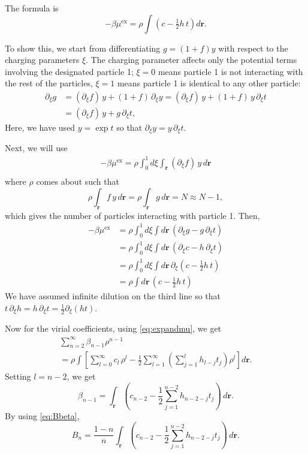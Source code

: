 \documentclass[aip,jcp,reprint,superscriptaddress]{revtex4-1}
\numberwithin{equation}{subsection}
\newcommand{\vct}[1]{\mathbf{#1}}
\providecommand{\vr}{} %
\renewcommand{\vr}{\vct{r}}
\newcommand{\supex}[1]{ { { #1 }^{ \mathrm{ex} } } }
\newcommand{\muex}{\supex{\mu}}
\begin{document}
The formula is
\begin{equation}
  -\beta \muex = \rho \int \left( c - \tfrac{1}{2} h \, t\right) d\vr.
  \label{eq:muex}
\end{equation}

To show this,
we start from differentiating $g = (1+f)y$ with respect to
the charging parameters $\xi$.
The charging parameter affects only the potential terms involving
the designated particle 1;
$\xi = 0$ means particle 1 is not interacting with the rest of the particles,
$\xi = 1$ means particle 1 is identical to any other particle:
\begin{align*}
  \partial_\xi g
  &= (\partial_\xi f) \, y + (1+f) \, \partial_\xi y
  = (\partial_\xi f) \, y + (1+f) \, y \, \partial_\xi t \\
  &= (\partial_\xi f) \, y + g \, \partial_\xi t,
\end{align*}
Here, we have used $y = \exp t$ so that $\partial_\xi y = y \, \partial_\xi t$.

Next, we will use
\begin{align*}
  -\beta \muex
  = \rho \int_0^1 d\xi \int_\vr (\partial_\xi f) \, y \, d\vr \\
\end{align*}
where $\rho$ comes about such that
\[
  \rho \int_\vr f \, y \, d \vr = \rho \int_\vr g \, d\vr = N
  \approx N - 1,
\]
which gives the number of particles interacting with particle 1.
%
Then,
\begin{align*}
  -\beta \muex
  &= \rho \int_0^1 d\xi \int d\vr \, (\partial_\xi g - g \, \partial_\xi t) \\
  &= \rho \int_0^1 d\xi \int d\vr \, (\partial_\xi c - h \, \partial_\xi t) \\
  &= \rho \int_0^1 d\xi \int d\vr \, \partial_\xi \left(c - \tfrac{1}{2} h \, t \right) \\
  &= \rho \int d\vr \, \left(c - \tfrac{1}{2} h \, t \right)
\end{align*}
We have assumed infinite dilution on the third line so that
$t \, \partial_\xi h = h \, \partial_\xi t = \tfrac{1}{2} \partial_\xi (h t)$.


Now for the virial coefficients,
using \eqref{eq:expandmu},
we get
\begin{multline*}
  \sum_{n = 2}^\infty \beta_{n - 1} \rho^{n - 1}
\\
= \rho \int
  \left[
  \sum_{l = 0}^\infty c_l \, \rho^l
  -\frac{1}{2}
  \sum_{l = 1}^\infty
  \left(
  \sum_{j = 1}^l h_{l - j} t_j
  \right) \rho^l
  \right] d\vr.
\end{multline*}
Setting $l = n - 2$, we get
\[
  \beta_{n - 1}
= \int_\vr
  \left(
    c_{n-2}
  -\frac{1}{2}
  \sum_{j = 1}^{n-2} h_{n - 2 - j} t_j
  \right) \, d\vr.
\]
By using \eqref{eq:Bbeta},
\[
  B_n
= \frac{1-n}{n} \int_\vr
  \left(
    c_{n-2}
  -\frac{1}{2}
  \sum_{j = 1}^{n-2} h_{n - 2 - j} t_j
  \right) \, d\vr.
\]
\end{document}
